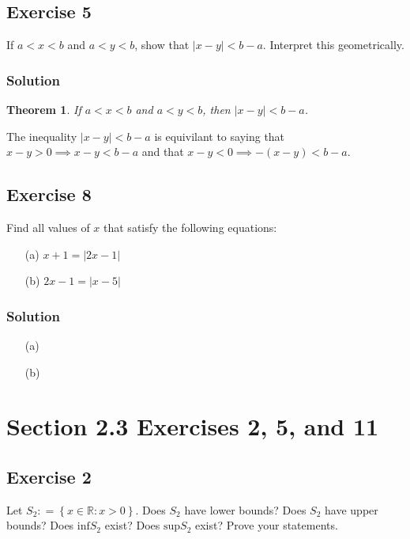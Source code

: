\documentclass[12pt]{article}
\newtheorem*{thm}{Theorem}
\begin{document}
\subsection*{Exercise 5}
If $a < x < b$ and $a < y < b$, show that $\left|x - y\right| < b - a$. Interpret this geometrically.

\subsubsection*{Solution}
\begin{thm}
If $a < x < b$ and $a < y < b$, then $\left| x - y \right| < b - a$.
\end{thm}

The inequality $\left| x - y \right| < b - a$ is equivilant to saying that $x - y > 0 \implies x - y < b - a$ and that $x - y < 0 \implies -\left(x - y\right) < b - a$.

\subsection*{Exercise 8}
Find all values of $x$ that satisfy the following equations:
\begin{itemize}
\item[(a)] $x + 1 = \left|2x - 1\right|$
\item[(b)] $2x - 1 = \left|x - 5\right|$
\end{itemize}

\subsubsection*{Solution}
\begin{itemize}
\item[(a)]
\item[(b)]
\end{itemize}

\section*{Section 2.3 Exercises 2, 5, and 11}

\subsection*{Exercise 2}
Let $S_2 \mathrel{\mathop:}= \left\{x \in \mathbb{R} : x > 0\right\}$. Does $S_2$ have lower bounds? Does $S_2$ have upper bounds? Does $\text{inf}S_2$ exist? Does $\text{sup}S_2$ exist? Prove your statements.
\end{document}
